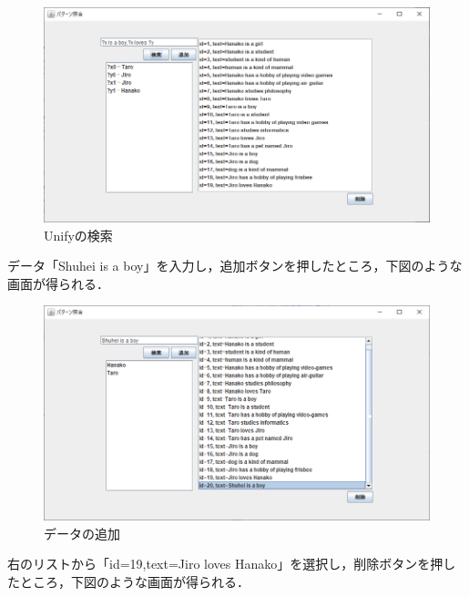 \documentclass[12pt]{jarticle}
\begin{document}
\begin{figure}[!hbt]
  	\begin{center}
  		\includegraphics[scale=0.60]{images/scs2-3-6.png}
	\end{center}
  	\caption{Unifyの検索}
\end{figure}
\clearpage
\fi

データ「Shuhei is a boy」を入力し，追加ボタンを押したところ，下図のような画面が得られる．

\begin{figure}[!hbt]
  	\begin{center}
  		\includegraphics[scale=0.60]{images/scs2-3-3.png}
	\end{center}
  	\caption{データの追加}
\end{figure}
\clearpage

右のリストから「id=19,text=Jiro loves Hanako」を選択し，削除ボタンを押したところ，下図のような画面が得られる．
\end{document}
